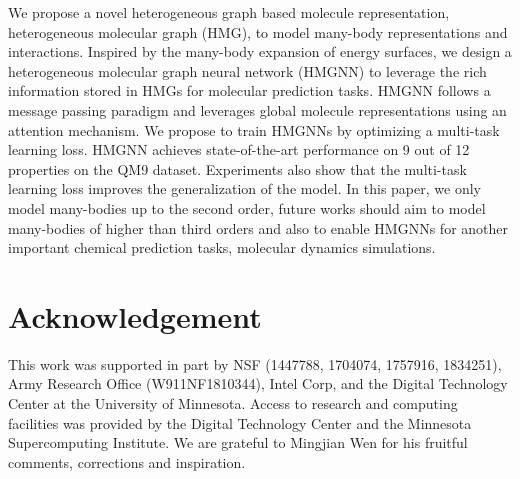 \documentclass[conference]{IEEEtran}
\begin{document}
We propose a novel heterogeneous graph based molecule representation, heterogeneous molecular graph (HMG), to model many-body representations and interactions. Inspired by the many-body expansion of energy surfaces, we design a heterogeneous molecular graph neural network (HMGNN) to leverage the rich information stored in HMGs for molecular prediction tasks. HMGNN follows a message passing paradigm and leverages global molecule representations using an attention mechanism. We propose to train HMGNNs by optimizing a multi-task learning loss. HMGNN achieves state-of-the-art performance on 9 out of 12 properties on the QM9 dataset. Experiments also show that the multi-task learning loss improves the generalization of the model. In this paper, we only model many-bodies up to the second order, future works should aim to model many-bodies of higher than third orders and also to enable HMGNNs for another important chemical prediction tasks, molecular dynamics simulations.

\section{Acknowledgement}

This work was supported in part by NSF (1447788, 1704074, 1757916, 1834251), Army
Research Office (W911NF1810344), Intel Corp, and the Digital Technology Center at the
University of Minnesota. Access to research and computing facilities was provided by
the Digital Technology Center and the Minnesota Supercomputing Institute. We are grateful to Mingjian Wen for his fruitful comments, corrections and inspiration.



\end{document}
